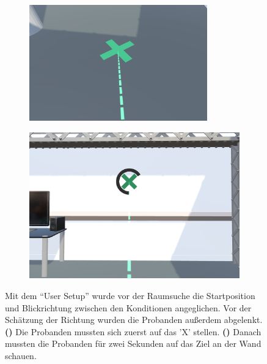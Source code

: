 \begin{figure}[h]
    \begin{subfigure}{0.49\linewidth}
        \centering
        \includegraphics[width=\linewidth, height=5cm]{figures/screenshots/user_setup_floor}
        \caption{}
        \label{sfig:user_setup_floor}
    \end{subfigure}%
    \hfill
    \begin{subfigure}{0.49\linewidth}
        \centering
        \includegraphics[width=\linewidth]{figures/screenshots/user_setup_wall}
        \caption{}
        \label{sfig:user_setup_wall}
    \end{subfigure}
    \caption{Mit dem \enquote{User Setup} wurde vor der Raumsuche die Startposition und Blickrichtung zwischen den Konditionen angeglichen. %
    Vor der Schätzung der Richtung wurden die Probanden außerdem abgelenkt. %
    \textbf{()} Die Probanden mussten sich zuerst auf das 'X' stellen. %
    \textbf{()} Danach mussten die Probanden für zwei Sekunden auf das Ziel an der Wand schauen.}
    \label{fig:user_setup}
\end{figure}


